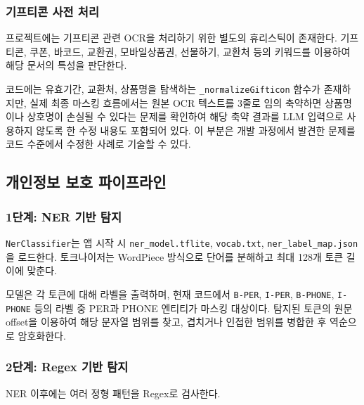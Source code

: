 \documentclass[11pt,a4paper]{article}
\begin{document}
\subsubsection{기프티콘 사전 처리}

프로젝트에는 기프티콘 관련 OCR을 처리하기 위한 별도의 휴리스틱이 존재한다. 기프티콘, 쿠폰, 바코드, 교환권, 모바일상품권, 선물하기, 교환처 등의 키워드를 이용하여 해당 문서의 특성을 판단한다.

코드에는 유효기간, 교환처, 상품명을 탐색하는 \texttt{\_normalizeGifticon} 함수가 존재하지만, 실제 최종 마스킹 흐름에서는 원본 OCR 텍스트를 3줄로 임의 축약하면 상품명이나 상호명이 손실될 수 있다는 문제를 확인하여 해당 축약 결과를 LLM 입력으로 사용하지 않도록 한 수정 내용도 포함되어 있다. 이 부분은 개발 과정에서 발견한 문제를 코드 수준에서 수정한 사례로 기술할 수 있다.

\subsection{개인정보 보호 파이프라인}

\subsubsection{1단계: NER 기반 탐지}

\texttt{NerClassifier}는 앱 시작 시 \texttt{ner\_model.tflite}, \texttt{vocab.txt}, \texttt{ner\_label\_map.json}을 로드한다. 토크나이저는 WordPiece 방식으로 단어를 분해하고 최대 128개 토큰 길이에 맞춘다.

모델은 각 토큰에 대해 라벨을 출력하며, 현재 코드에서 \texttt{B-PER}, \texttt{I-PER}, \texttt{B-PHONE}, \texttt{I-PHONE} 등의 라벨 중 PER과 PHONE 엔티티가 마스킹 대상이다. 탐지된 토큰의 원문 offset을 이용하여 해당 문자열 범위를 찾고, 겹치거나 인접한 범위를 병합한 후 역순으로 암호화한다.

\subsubsection{2단계: Regex 기반 탐지}

NER 이후에는 여러 정형 패턴을 Regex로 검사한다.
\end{document}
